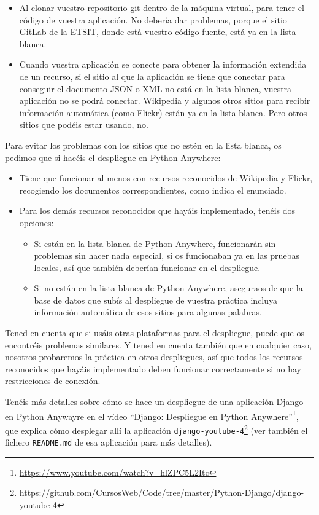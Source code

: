\begin{itemize}
\item Al clonar vuestro repositorio git dentro de la máquina virtual, para tener el código de vuestra aplicación. No debería dar problemas, porque el sitio GitLab de la ETSIT, donde está vuestro código fuente, está ya en la lista blanca.
\item Cuando vuestra aplicación se conecte para obtener la información extendida de un recurso, si el sitio al que la aplicación se tiene que conectar para conseguir el documento JSON o XML no está en la lista blanca, vuestra aplicación no se podrá conectar. Wikipedia y algunos otros sitios para recibir información automática (como Flickr) están ya en la lista blanca. Pero otros sitios que podéis estar usando, no.
\end{itemize}

Para evitar los problemas con los sitios que no estén en la lista blanca, os pedimos que si hacéis el despliegue en Python Anywhere:

\begin{itemize}
\item Tiene que funcionar al menos con recursos reconocidos de Wikipedia y Flickr, recogiendo los documentos correspondientes, como indica el enunciado.
\item Para los demás recursos reconocidos que hayáis implementado, tenéis dos opciones:
  \begin{itemize}
  \item Si están en la lista blanca de Python Anywhere, funcionarán sin problemas sin hacer nada especial, si os funcionaban ya en las pruebas locales, así que también deberían funcionar en el despliegue.
  \item Si no están en la lista blanca de Python Anywhere, aseguraos de que la base de datos que subís al despliegue de vuestra práctica incluya información automática de esos sitios para algunas palabras.
  \end{itemize}
\end{itemize}

Tened en cuenta que si usáis otras plataformas para el despliegue, puede que os encontréis problemas similares. Y tened en cuenta también que en cualquier caso, nosotros probaremos la práctica en otros despliegues, así que todos los recursos reconocidos que hayáis implementado deben funcionar correctamente si no hay restricciones de conexión.

Tenéis más detalles sobre cómo se hace un despliegue de una aplicación Django en Python Anywayre en el vídeo ``Django: Despliegue en Python Anywhere''\footnote{\url{https://www.youtube.com/watch?v=hlZPC5L2Itc}}, que explica cómo desplegar allí la aplicación \texttt{django-youtube-4}\footnote{\url{https://github.com/CursosWeb/Code/tree/master/Python-Django/django-youtube-4}} (ver también el fichero \texttt{README.md} de esa aplicación para más detalles).

